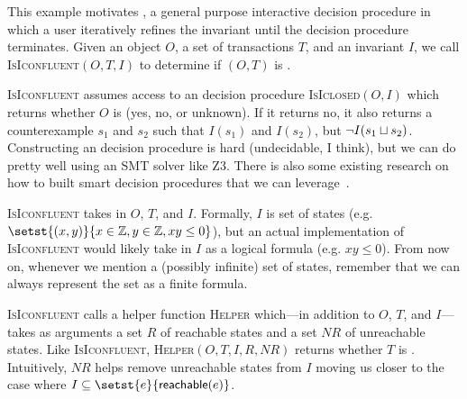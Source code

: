 \newcommand{\IsIconfluent}{\textsc{IsIconfluent}}
\newcommand{\IsIclosed}{\textsc{IsIclosed}}
\newcommand{\Helper}{\textsc{Helper}}

This example motivates , a general
purpose interactive \Iconfluence{} decision procedure in which a user
iteratively refines the invariant until the decision procedure terminates.
Given an object $O$, a set of transactions $T$, and an invariant $I$, we call
\IsIconfluent$(O, T, I)$ to determine if $(O, T)$ is \Iconfluent{}.

\IsIconfluent{} assumes access to an \Iclosed{} decision procedure
\IsIclosed$(O, I)$ which returns whether $O$ is \Iclosed{} (yes, no, or
unknown). If it returns no, it also returns a counterexample $s_1$ and $s_2$
such that $I(s_1)$ and $I(s_2)$, but $\lnot I(s_1 \sqcup s_2)$. Constructing an
\Iclosed{} decision procedure is hard (undecidable, I think), but we can do
pretty well using an SMT solver like Z3. There is also some existing research
on how to built smart \Iclosed{} decision procedures that we can
leverage~\cite{li2014automating}.

\IsIconfluent{} takes in $O$, $T$, and $I$. Formally, $I$ is set of states
(e.g. $\setst{(x, y)}{x \in \ints, y \in \ints, xy \leq 0}$), but an actual
implementation of \IsIconfluent{} would likely take in $I$ as a logical formula
(e.g. $xy \leq 0$). From now on, whenever we mention a (possibly infinite) set
of states, remember that we can always represent the set as a finite formula.

\IsIconfluent{} calls a helper function \Helper{} which---in addition to $O$,
$T$, and $I$---takes as arguments a set $R$ of reachable states and a set $NR$
of unreachable states. Like \IsIconfluent, \Helper$(O, T, I, R, NR)$ returns
whether $T$ is \Iconfluent. Intuitively, $NR$ helps remove unreachable states
from $I$ moving us closer to the case where $I \subseteq
\setst{e}{\reachable{e}}$.


